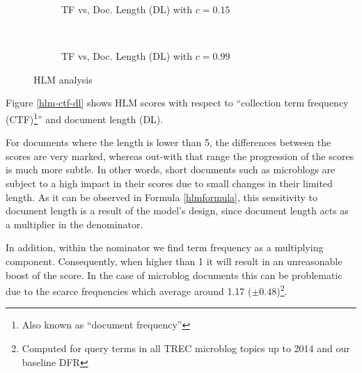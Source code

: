 %         

%	

\begin{figure}[]
     \begin{subfigure}[b]{0.5\textwidth}
      \centering
      \caption{TF vs, Doc. Length (DL)  with $c = 0.15$}
       
       	\label{cTFVSDL15}
    \end{subfigure}  
      ~
     \begin{subfigure}[b]{0.5\textwidth}
      \centering
      \caption{TF vs, Doc. Length (DL)  with $c = 0.99$}
       
       \label{cTFVSDL99}
    \end{subfigure}  
    \caption{HLM analysis}
	\label{cTFVSDL}
\end{figure}

Figure \ref{hlm-ctf-dl} shows HLM scores with respect to ``collection term frequency (CTF)\footnote{Also known as ``document frequency''}'' and document length (DL). 

For documents where the length is lower than 5, the differences between the scores are very marked, whereas out-with that range the progression of the scores is much more subtle. In other words, short documents such as microblogs are subject to a high impact in their scores due to small changes in their limited length. As it can be observed in Formula \ref{hlmformula}, this sensitivity to document length is a result of the model's design, since document length acts as a multiplier in the denominator. 

In addition, within the nominator we find term frequency as a multiplying component. Consequently, when higher than 1 it will result in an unreasonable boost of the score. In the case of microblog documents this can be problematic due to the scarce frequencies which average around 1.17 ($\pm 0.48$)\footnote{Computed for query terms in all TREC microblog topics up to 2014 and our baseline DFR}.
 
